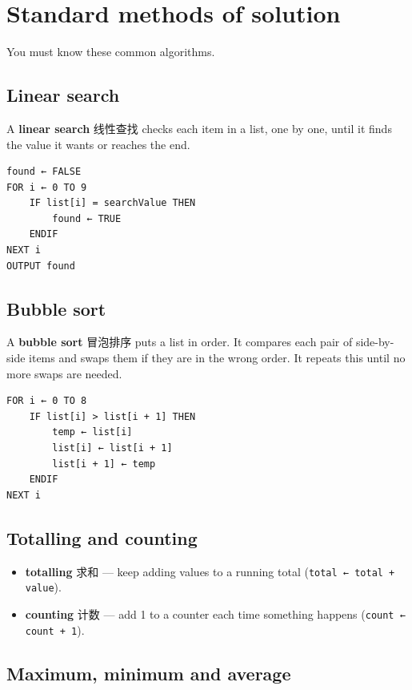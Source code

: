 \documentclass[11pt]{article}
\begin{document}
\section*{Standard methods of solution}

You must know these common algorithms.

\subsection*{Linear search}

A \textbf{linear search} 线性查找 checks each item in a list, one by one, until it finds the value it wants or reaches the end.

\begin{Verbatim}
found ← FALSE
FOR i ← 0 TO 9
    IF list[i] = searchValue THEN
        found ← TRUE
    ENDIF
NEXT i
OUTPUT found
\end{Verbatim}

\subsection*{Bubble sort}

A \textbf{bubble sort} 冒泡排序 puts a list in order. It compares each pair of side-by-side items and swaps them if they are in the wrong order. It repeats this until no more swaps are needed.

\begin{Verbatim}
FOR i ← 0 TO 8
    IF list[i] > list[i + 1] THEN
        temp ← list[i]
        list[i] ← list[i + 1]
        list[i + 1] ← temp
    ENDIF
NEXT i
\end{Verbatim}

\subsection*{Totalling and counting}

\begin{itemize}
\item \textbf{totalling} 求和 — keep adding values to a running total (\texttt{total ← total + value}).

\item \textbf{counting} 计数 — add 1 to a counter each time something happens (\texttt{count ← count + 1}).

\end{itemize}

\subsection*{Maximum, minimum and average}
\end{document}
